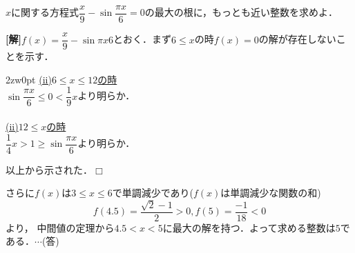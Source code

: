 \documentclass[a4j]{jarticle}
\begin{document}

     \begin{oframed}
     $x$に関する方程式$\dfrac{x}{9}-\sin\dfrac{\pi x}{6}=0$の最大の根に，もっとも近い整数を求めよ．
     \end{oframed}

\setlength{\columnseprule}{0.4pt}
\begin{multicols}{2}
{\bf[解]}$f(x)=\dfrac{x}{9}-\sin{\pi x}{6}$とおく．まず$6\le x$の時$f(x)=0$の解が存在しないことを示す．
     \begin{indentation}{2zw}{0pt}
     \noindent\underline{(ii)$6\le x\le12$の時} \\
     $\sin\dfrac{\pi x}{6}\le0<\dfrac{1}{9}x$より明らか．\\ \\
     \underline{(ii)$12\le x$の時} \\
     $\dfrac{1}{4}x>1\ge\sin\dfrac{\pi x}{6}$より明らか．\\
     \end{indentation}
以上から示された．$\Box$

さらに$f(x)$は$3\le x\le6$で単調減少であり($f(x)$は単調減少な関数の和)
\[f(4.5)=\frac{\sqrt{2}-1}{2}>0 , f(5)=\frac{-1}{18}<0\]
より，
中間値の定理から$4.5<x<5$に最大の解を持つ．よって求める整数は$5$である．$\cdots$(答)
\newpage
\end{multicols}
\end{document}
